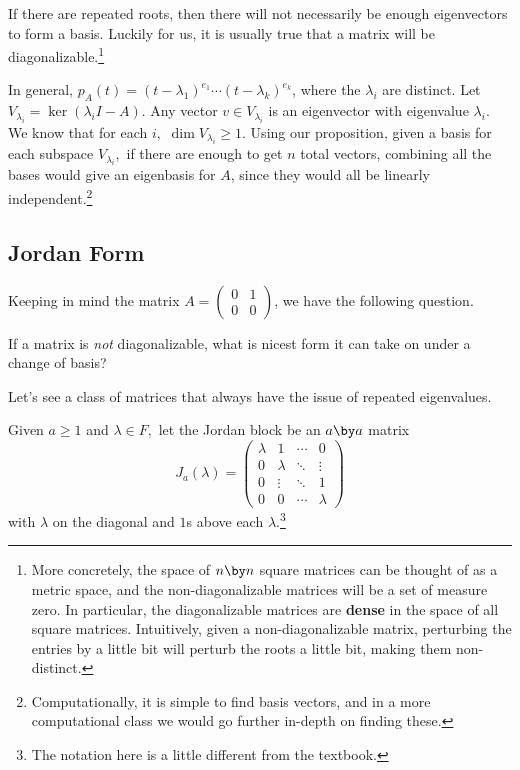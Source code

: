 If there are repeated roots, then there will not necessarily be enough eigenvectors to form a basis. Luckily for us, it is usually true that a matrix will be diagonalizable.\footnote{More concretely, the space of $n \by n$ square matrices can be thought of as a metric space, and the non-diagonalizable matrices will be a set of measure zero. In particular, the diagonalizable matrices are \textbf{dense} in the space of all square matrices. Intuitively, given a non-diagonalizable matrix, perturbing the entries by a little bit will perturb the roots a little bit, making them non-distinct.}

In general, $p_A(t) = (t-\lambda_1)^{e_1}\cdots(t-\lambda_k)^{e_k}$, where the $\lambda_i$ are distinct. Let $V_{\lambda_i} = \ker(\lambda_i I - A).$ Any vector $v \in V_{\lambda_i}$ is an eigenvector with eigenvalue $\lambda_i.$ We know that for each $i,$ $\dim V_{\lambda_i} \geq 1$. Using our proposition, given a basis for each subspace $V_{\lambda_i},$ if there are enough to get $n$ total vectors, combining all the bases would give an eigenbasis for $A$, since they would all be linearly independent.\footnote{Computationally, it is simple to find basis vectors, and in a more computational class we would go further in-depth on finding these.} 

\subsection{Jordan Form}

Keeping in mind the matrix $A = \begin{pmatrix}
0 & 1 \\ 0 & 0
\end{pmatrix}$, we have the following question.
\begin{qq}
If a matrix is \emph{not} diagonalizable, what is nicest form it can take on under a change of basis?
\end{qq}

Let's see a class of matrices that always have the issue of repeated eigenvalues.
\begin{definition}
Given $a \geq 1$ and $\lambda \in F,$ let the Jordan block be an $a \by a$ matrix \[
J_a(\lambda) = \begin{pmatrix}
\lambda & 1 & \cdots & 0 \\
0 & \lambda & \ddots & \vdots \\
0 & \vdots & \ddots & 1 \\
0 & 0& \cdots & \lambda
\end{pmatrix}
\]
with $\lambda$ on the diagonal and $1$s above each $\lambda$.\footnote{The notation here is a little different from the textbook.}
\end{definition}

